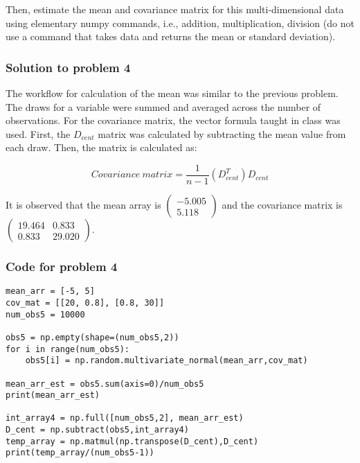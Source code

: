 \documentclass[12pt]{article}%
\begin{document}
Then, estimate the mean and covariance matrix for this multi-dimensional data using elementary numpy commands, i.e., addition, multiplication, division (do not use a command that takes data and returns the mean or standard deviation).\\

\subsubsection{Solution to problem 4}

The workflow for calculation of the mean was similar to the previous problem. The draws for a variable were summed and averaged across the number of observations. For the covariance matrix, the vector formula taught in class was used. First, the $D_{cent}$ matrix was calculated by subtracting the mean value from each draw. Then, the matrix is calculated as:

\begin{equation}
    Covariance\ matrix = \frac{1}{n-1}(D_{cent}^T)D_{cent}
\end{equation}

\noindent It is observed that the mean array is $\begin{pmatrix}-5.005\\5.118\end{pmatrix}$ and the covariance matrix is $\begin{pmatrix}19.464 & 0.833\\0.833 & 29.020\end{pmatrix}$.


\subsubsection{Code for problem 4}
\begin{lstlisting}
mean_arr = [-5, 5]
cov_mat = [[20, 0.8], [0.8, 30]]
num_obs5 = 10000

obs5 = np.empty(shape=(num_obs5,2))
for i in range(num_obs5):
    obs5[i] = np.random.multivariate_normal(mean_arr,cov_mat)

mean_arr_est = obs5.sum(axis=0)/num_obs5
print(mean_arr_est)

int_array4 = np.full([num_obs5,2], mean_arr_est)
D_cent = np.subtract(obs5,int_array4)
temp_array = np.matmul(np.transpose(D_cent),D_cent)
print(temp_array/(num_obs5-1))
\end{lstlisting}

\end{document}
